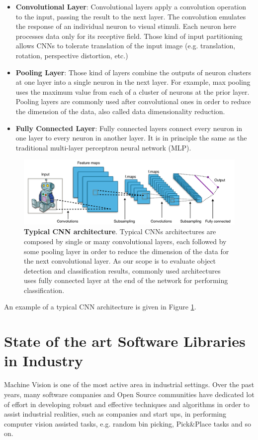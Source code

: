 \begin{itemize}
	\item \textbf{Convolutional Layer}: Convolutional layers apply a convolution operation to the input, passing the result to the next layer. The convolution emulates the response of an individual neuron to visual stimuli. Each neuron here processes data only for its receptive field. Those kind of input partitioning allows CNNs to tolerate translation of the input image (e.g. translation, rotation, perspective distortion, etc.)
	\item \textbf{Pooling Layer}: Those kind of layers combine the outputs of neuron clusters at one layer into a single neuron in the next layer. For example, max pooling uses the maximum value from each of a cluster of neurons at the prior layer. Pooling layers are commonly used after convolutional ones in order to reduce the dimension of the data, also called data dimensionality reduction.
	\item \textbf{Fully Connected Layer}: Fully connected layers connect every neuron in one layer to every neuron in another layer. It is in principle the same as the traditional multi-layer perceptron neural network (MLP).
\end{itemize}

\begin{figure}
    \centering
    \includegraphics[width=\textwidth]{figures/1_perception_and_sensing_in_robotics/typical_cnn}
    \caption{\textbf{Typical CNN architecture}. Typical CNNs architectures are composed by single or many convolutional layers, each followed by some pooling layer in order to reduce the dimension of the data for the next convolutional layer. As our scope is to evaluate object detection and classification results, commonly used architectures uses fully connected layer at the end of the network for performing classification.} 
    \label{fig:typical_cnn}
\end{figure}

An example of a typical CNN architecture is given in Figure \ref{fig:typical_cnn}.

\section{State of the art Software Libraries in Industry}\label{sec:industrylibraries}
Machine Vision is one of the most active area in industrial settings. Over the past years, many software companies and Open Source communities have dedicated lot of effort in developing robust and effective techniques and algorithms in order to assist industrial realities, such as companies and start ups, in performing computer vision assisted tasks, e.g. random bin picking, Pick\&Place tasks and so on.

